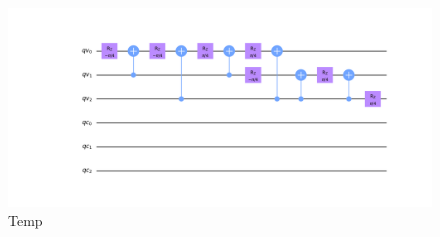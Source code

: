 \documentclass[../../dissertation.tex]{subfiles}
\begin{document}
\begin{figure}[!h]
	\centering
	\includegraphics[scale=0.27]{img/Qiskit/CoinedQuantumWalk/Search/Circuits/CoinedSearchQiskitCircOracle_N3_M4_S5.png}
	\caption{Temp} 
	\label{fig:coinedQWSearchOracleCircuitQistkit}
\end{figure}\par
\end{document}
